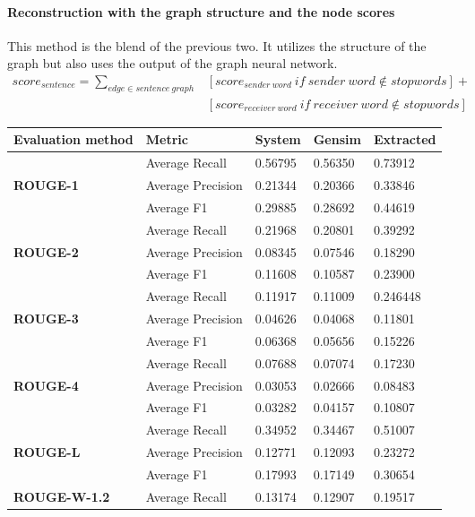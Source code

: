 \paragraph{Reconstruction with the graph structure and the node scores}

This method is the blend of the previous two. It utilizes the structure of the graph but also uses the output of the graph neural network.
\begin{eqnarray*}
	score_{sentence} = \sum_{edge \in sentence\ graph} &[score_{sender\ word}\ if\ sender\ word \notin stopwords] + \\&[score_{receiver\ word}\ if\ receiver\ word \notin stopwords]
\end{eqnarray*}
\begin{longtable}{| l | l | l | l | l |}
	\hline
	\textbf{Evaluation method}&\textbf{Metric}&\textbf{System}&\textbf{Gensim}&\textbf{Extracted}\\ \hline \hline
	\multirow{3}{*}{\textbf{ROUGE-1}}
		&Average Recall&0.56795&0.56350&0.73912 \\
		&Average Precision&0.21344&0.20366&0.33846 \\ 
		&Average F1&0.29885&0.28692&0.44619 \\ \hline \hline
	\multirow{3}{*}{\textbf{ROUGE-2}}
		&Average Recall&0.21968&0.20801&0.39292 \\
		&Average Precision&0.08345&0.07546&0.18290 \\
		&Average F1&0.11608&0.10587&0.23900 \\ \hline \hline
	\multirow{3}{*}{\textbf{ROUGE-3}}
		&Average Recall&0.11917&0.11009&0.246448 \\
		&Average Precision&0.04626&0.04068&0.11801 \\
		&Average F1&0.06368&0.05656&0.15226 \\ \hline \hline
	\multirow{3}{*}{\textbf{ROUGE-4}}
		&Average Recall&0.07688&0.07074&0.17230 \\
		&Average Precision&0.03053&0.02666&0.08483 \\
		&Average F1&0.03282&0.04157&0.10807 \\ \hline \hline
	\multirow{3}{*}{\textbf{ROUGE-L}}
		&Average Recall&0.34952&0.34467&0.51007 \\
		&Average Precision&0.12771&0.12093&0.23272 \\
		&Average F1&0.17993&0.17149&0.30654 \\ \hline \hline
	\multirow{3}{*}{\textbf{ROUGE-W-1.2}}
		&Average Recall&0.13174&0.12907&0.19517 \\

\end{longtable}
